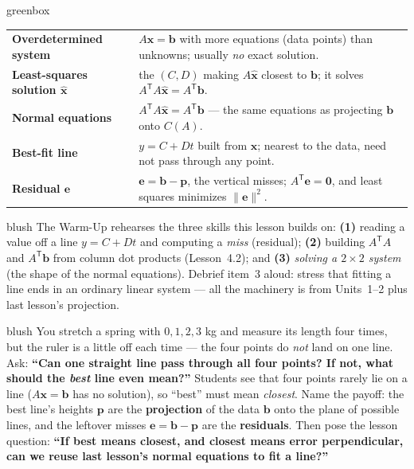 \documentclass[10pt]{article}
\newcommand{\xx}{\mathbf{x}}
\newcommand{\bb}{\mathbf{b}}
\newcommand{\pp}{\mathbf{p}}
\newcommand{\ee}{\mathbf{e}}
\newcommand{\zero}{\mathbf{0}}
\newcommand{\T}{\mathsf{T}}
\begin{document}
\begin{skillbox}{greenbox}
\renewcommand{\arraystretch}{1.3}
\begin{tabularx}{\linewidth}{@{}l X@{}}
\textbf{Overdetermined system} & $A\xx=\bb$ with more equations (data points) than unknowns; usually \emph{no} exact solution. \\
\textbf{Least-squares solution $\hat{\xx}$} & the $(C,D)$ making $A\hat{\xx}$ closest to $\bb$; it solves $A^{\T}A\hat{\xx}=A^{\T}\bb$. \\
\textbf{Normal equations} & $A^{\T}A\hat{\xx}=A^{\T}\bb$ --- the same equations as projecting $\bb$ onto $C(A)$. \\
\textbf{Best-fit line} & $y=C+Dt$ built from $\hat{\xx}$; nearest to the data, need not pass through any point. \\
\textbf{Residual $\ee$} & $\ee=\bb-\pp$, the vertical misses; $A^{\T}\ee=\zero$, and least squares minimizes $\|\ee\|^2$. \\
\end{tabularx}
\end{skillbox}

\begin{fixedskillbox}{blush}
    The Warm-Up rehearses the three skills this lesson builds on:
    \textbf{(1)} reading a value off a line $y=C+Dt$ and computing a \emph{miss} (residual);
    \textbf{(2)} building $A^{\T}A$ and $A^{\T}\bb$ from column dot products (Lesson~4.2); and
    \textbf{(3)} \emph{solving a $2\times2$ system} (the shape of the normal equations). Debrief item~3
    aloud: stress that fitting a line ends in an ordinary linear system --- all the machinery is from
    Units~1--2 plus last lesson's projection.
\end{fixedskillbox}

\begin{skillbox}[Hook]{blush}
    You stretch a spring with $0,1,2,3$ kg and measure its length four times, but the ruler is a little off
    each time --- the four points do \emph{not} land on one line. Ask: \textbf{``Can one straight line pass
    through all four points? If not, what should the \emph{best} line even mean?''} Students see that four
    points rarely lie on a line ($A\xx=\bb$ has no solution), so ``best'' must mean \emph{closest}. Name the
    payoff: the best line's heights $\pp$ are the \textbf{projection} of the data $\bb$ onto the plane of
    possible lines, and the leftover misses $\ee=\bb-\pp$ are the \textbf{residuals}. Then pose the lesson
    question: \textbf{``If best means closest, and closest means error perpendicular, can we reuse last
    lesson's normal equations to fit a line?''}
\end{skillbox}
\end{document}
